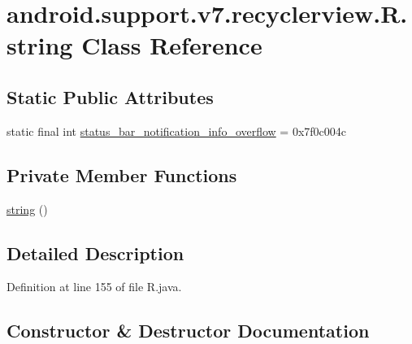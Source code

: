 \hypertarget{classandroid_1_1support_1_1v7_1_1recyclerview_1_1_r_1_1string}{}\section{android.\+support.\+v7.\+recyclerview.\+R.\+string Class Reference}
\label{classandroid_1_1support_1_1v7_1_1recyclerview_1_1_r_1_1string}
\subsection*{Static Public Attributes}
\begin{DoxyCompactItemize}
\item 
static final int \mbox{\hyperlink{classandroid_1_1support_1_1v7_1_1recyclerview_1_1_r_1_1string_a1ea81bbbfacad9218b17fd12e0b9b258}{status\+\_\+bar\+\_\+notification\+\_\+info\+\_\+overflow}} = 0x7f0c004c
\end{DoxyCompactItemize}
\subsection*{Private Member Functions}
\begin{DoxyCompactItemize}
\item 
\mbox{\hyperlink{classandroid_1_1support_1_1v7_1_1recyclerview_1_1_r_1_1string_a8aea0a179ccf8abc4e8cfc80e3235be3}{string}} ()
\end{DoxyCompactItemize}


\subsection{Detailed Description}


Definition at line 155 of file R.\+java.



\subsection{Constructor \& Destructor Documentation}
\mbox{\label{classandroid_1_1support_1_1v7_1_1recyclerview_1_1_r_1_1string_a8aea0a179ccf8abc4e8cfc80e3235be3}} 
